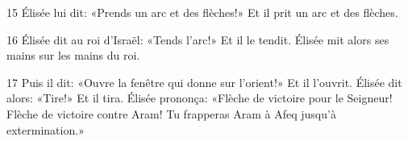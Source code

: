 
15 Élisée lui dit: «Prends un arc et des flèches!» Et il prit un arc et des flèches.

16 Élisée dit au roi d’Israël: «Tends l’arc!» Et il le tendit. Élisée mit alors ses mains sur les mains du roi.

17 Puis il dit: «Ouvre la fenêtre qui donne sur l’orient!» Et il l’ouvrit. Élisée dit alors: «Tire!» Et il tira. Élisée prononça: «Flèche de victoire pour le Seigneur! Flèche de victoire contre Aram! Tu frapperas Aram à Afeq jusqu’à extermination.»
